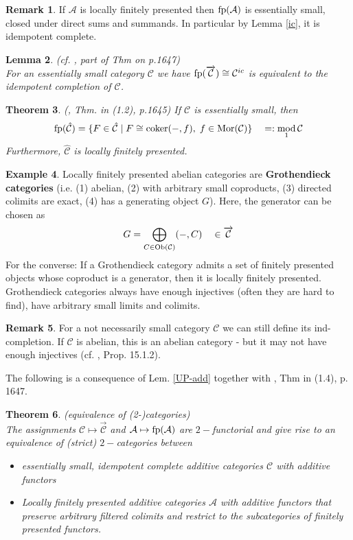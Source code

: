 \documentclass[11pt,a4paper]{amsart}
\theoremstyle{plain}
\newtheorem{thm}{Theorem}[section]
\newtheorem{lem}[thm]{Lemma}
\theoremstyle{definition}
\newtheorem{exa}[thm]{Example}
\newtheorem{rem}[thm]{Remark}
\DeclareMathOperator{\modu}{mod}
\DeclareMathOperator{\coKer}{coker}
\newcommand{\mcA}{\mathcal{A}}
\newcommand{\mcC}{\mathcal{C}}
\begin{document}
\begin{rem}
If $\mcA$ is locally finitely presented then ${\rm fp} (\mcA)$ is essentially small, closed under direct sums and summands. In particular by Lemma \ref{ic}, it is idempotent complete.
\end{rem}

\begin{lem} (cf. \cite{CB}, part of Thm on p.1647) \\
For an essentially small category $\mcC$ we have ${\rm fp} (\overrightarrow{\mcC})\cong \mcC^{ic}$ is equivalent to the idempotent completion of $\mcC$.   
\end{lem}

\begin{thm} (\cite{CB}, Thm. in (1.2), p.1645)
If $\mcC$ is essentially small, then 
\[
{\rm fp} (\hat{\mcC})=\{F\in \hat{\mcC} \mid F\cong \coKer (-,f), \; f \in {\rm{Mor}} (\mcC)\}\quad  =:\modu_1\mcC
\]
Furthermore, $\hat{\mcC}$ is locally finitely presented. 
\end{thm}


 \begin{exa} Locally finitely presented abelian categories are \textbf{Grothendieck categories} (i.e. (1) abelian, (2) with arbitrary small coproducts, (3) directed colimits are exact, (4) has a generating object $G$). Here, the generator can be chosen as 
 \[
 G=\bigoplus_{C\in {\rm Ob}(\mcC)} (-,C)  \quad \in \overrightarrow{\mcC} 
 \]
 For the converse: If a Grothendieck category admits a set of finitely presented objects whose coproduct is a generator, then it is locally finitely presented. \\
 Grothendieck categories always have enough injectives (often they are hard to find), have arbitrary small limits and colimits. 
 \end{exa}

\begin{rem}
For a not necessarily small category $\mcC$ we can still define its ind-completion. If $\mcC$ is abelian, this is an abelian category - but it may not have enough injectives (cf. \cite{KS-Ind-Sheaves}, Prop. 15.1.2). 
\end{rem}

The following is a consequence of Lem. \ref{UP-add} together with \cite{CB}, Thm in (1.4), p. 1647. 
\begin{thm} (equivalence of (2-)categories) \\
The assignments $\mcC\mapsto \overrightarrow{\mcC}$ and $\mcA\mapsto {\rm fp} (\mcA)$ are $2-$functorial and give rise to an equivalence of  (strict) $2-$categories between 
\begin{itemize}
\item[(1)] essentially small, idempotent complete additive categories $\mcC$ with additive functors
\item[(2)] Locally finitely presented additive categories $\mcA$ with
additive functors that preserve arbitrary filtered colimits and restrict to the subcategories of finitely presented functors. 
\end{itemize}
\end{thm}
\end{document}
